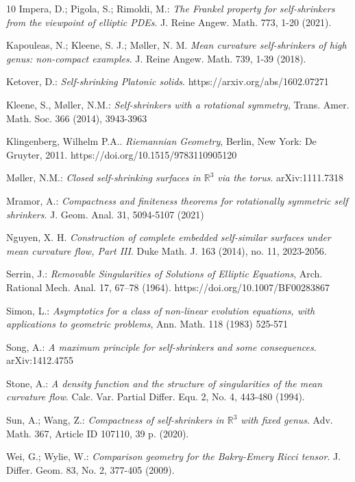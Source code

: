 \documentclass[12pt]{amsart}
\numberwithin{equation}{section}
\theoremstyle{remark}
\begin{document}
\begin{thebibliography}{10}
		Impera, D.; Pigola, S.; Rimoldi, M.:
		{\sl The Frankel property for self-shrinkers from the viewpoint of elliptic PDEs}. J. Reine Angew. Math. 773, 1-20 (2021).
		
		Kapouleas, N.; Kleene, S. J.; M\o ller, N. M.
		{\sl Mean curvature self-shrinkers of high genus: non-compact examples}. J. Reine Angew. Math. 739, 1-39 (2018).
		
		
		Ketover, D.:
		{\sl Self-shrinking Platonic solids}. https://arxiv.org/abs/1602.07271
		
		Kleene, S., M\o ller, N.M.:
		{\sl Self-shrinkers with a rotational symmetry}, Trans. Amer. Math. Soc. 366 (2014), 3943-3963
		
		Klingenberg, Wilhelm P.A.. {\sl Riemannian Geometry}, Berlin, New York: De Gruyter, 2011. https://doi.org/10.1515/9783110905120
		
		M\o ller, N.M.:
		{\sl Closed self-shrinking surfaces in $\mathbb R^3$ via the torus}. arXiv:1111.7318
		
		Mramor, A.: {\sl Compactness and finiteness theorems for rotationally symmetric self shrinkers}.
		J. Geom. Anal. 31, 5094-5107 (2021)
		
		Nguyen, X. H.
		{\sl Construction of complete embedded self-similar surfaces under mean curvature flow, Part III}. Duke Math. J. 163 (2014), no. 11, 2023-2056.
		
		Serrin, J.: 
		{\sl Removable Singularities of Solutions 
			of Elliptic Equations}, Arch. Rational Mech. Anal. 17, 67–78 (1964). https://doi.org/10.1007/BF00283867
		
		Simon, L.: 
		{\sl Asymptotics for a class of non-linear evolution equations, with applications to geometric
			problems}, Ann. Math. 118 (1983) 525-571
		
		Song, A.:
		{\sl A maximum principle for self-shrinkers and some consequences}. arXiv:1412.4755
		
		Stone, A.:
		{\sl A density function and the structure of singularities of the mean curvature flow}. Calc. Var. Partial Differ. Equ. 2, No. 4, 443-480 (1994).
		
		Sun, A.; Wang, Z.:
		{\sl Compactness of self-shrinkers in $\mathbb R^3$ with fixed genus}. Adv. Math. 367, Article ID 107110, 39 p. (2020).
		
		Wei, G.; Wylie, W.:
		{\sl Comparison geometry for the Bakry-Emery Ricci tensor}. J. Differ. Geom. 83, No. 2, 377-405 (2009).
		
	\end{thebibliography}
	
\end{document}
